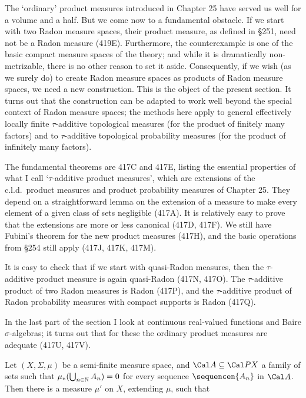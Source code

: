 
\def\chaptername{Topologies and measures I}
\def\sectionname{$\tau$-additive product measures}


The `ordinary' product measures introduced in Chapter 25 have served us
well for a volume and a half.   But we come now to a fundamental
obstacle.   If we start with two Radon measure spaces, their product
measure, as
defined in \S251, need not be a Radon measure (419E).   Furthermore, the
counterexample is one of the basic compact measure spaces of the theory;
and while it is dramatically non-metrizable, there is no other reason to
set it aside.   Consequently, if we wish (as we surely do) to create
Radon measure spaces as
products of Radon measure spaces, we need a new construction.   This is
the object of the present section.   It turns out that the construction
can be adapted to work well beyond the special context of Radon measure
spaces;  the methods here apply to general effectively locally finite
$\tau$-additive topological measures (for the product of finitely many
factors) and to $\tau$-additive topological probability measures (for
the product of infinitely many factors).

The fundamental theorems are 417C and 417E, listing the essential
properties of what I call `$\tau$-additive product measures', which are
extensions of the c.l.d.\ product measures and product probability
measures of Chapter 25.   They depend on a straightforward lemma on the
extension of
a measure to make every element of a given class of sets negligible
(417A).   It is relatively
easy to prove that the extensions are more or less canonical (417D,
417F).   We still have Fubini's theorem for the new product measures
(417H), and the basic operations from \S254 still apply (417J, 417K,
417M).

It is easy to check that if we start with quasi-Radon measures, then the
$\tau$-additive product measure is again quasi-Radon (417N, 417O).   The
$\tau$-additive product of two Radon measures is Radon (417P), and the
$\tau$-additive product of Radon probability measures with compact
supports is Radon (417Q).

In the last part of the section I look at continuous real-valued
functions and Baire $\sigma$-algebras;  it turns out that for these the
ordinary product measures are adequate (417U, 417V).

Let $(X,\Sigma,\mu)$ be a semi-finite measure
space, and $\Cal A\subseteq\Cal PX$ a family of sets such that
$\mu_*(\bigcup_{n\in\Bbb N}A_n)=0$ for every sequence $\sequencen{A_n}$
in $\Cal A$.   Then there is a measure $\mu'$ on $X$, extending $\mu$,
such that

